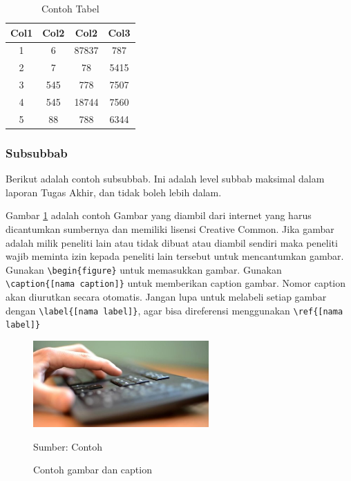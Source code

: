 	\begin{longtable}{|c|c|c|c|}
		\caption{Contoh Tabel}
		\label{table:2.contoh}\\
		\hline
		Col1 & Col2 & Col2 & Col3 \\
		\hline
		\endhead
		1 & 6 & 87837 & 787 \\ 
		\hline
		2 & 7 & 78 & 5415 \\
		\hline
		3 & 545 & 778 & 7507 \\
		\hline
		4 & 545 & 18744 & 7560 \\
		\hline
		5 & 88 & 788 & 6344 \\
		\hline
	\end{longtable}

\subsubsection{Subsubbab} \label{II.Teori1.1}
Berikut adalah contoh subsubbab. Ini adalah level subbab maksimal dalam laporan Tugas Akhir, dan tidak boleh lebih dalam. \par

Gambar \ref{fig:2.contoh} adalah contoh Gambar yang diambil dari internet yang harus dicantumkan sumbernya dan memiliki lisensi Creative Common. Jika gambar adalah milik peneliti lain atau tidak dibuat atau diambil sendiri maka peneliti wajib meminta izin kepada peneliti lain tersebut untuk mencantumkan gambar. Gunakan \verb|\begin{figure}| untuk memasukkan gambar. Gunakan \verb|\caption{[nama caption]}| untuk memberikan caption gambar. Nomor caption akan diurutkan secara otomatis. Jangan lupa untuk melabeli setiap gambar dengan \verb|\label{[nama label]}|, agar bisa direferensi menggunakan \verb|\ref{[nama label]}| \par
\begin{figure}[H] %
	\centering
	\includegraphics[width=0.6\textwidth]{figure/keyboard.jpg}
	\caption{Contoh gambar dan caption}
	\label{fig:2.contoh}
	{\footnotesize Sumber: Contoh} %
\end{figure}

